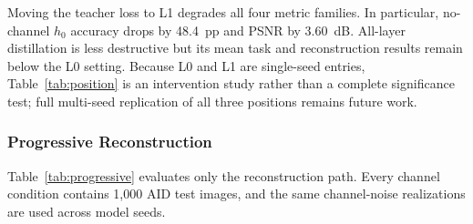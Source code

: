 \documentclass[letterpaper,journal]{IEEEtran}
\newcommand{\pp}{~pp\xspace}
\begin{document}
Moving the teacher loss to L1 degrades all four metric families. In particular, no-channel $h_0$ accuracy drops by 48.4\pp and PSNR by 3.60~dB. All-layer distillation is less destructive but its mean task and reconstruction results remain below the L0 setting. Because L0 and L1 are single-seed entries, Table~\ref{tab:position} is an intervention study rather than a complete significance test; full multi-seed replication of all three positions remains future work.

\subsubsection{Progressive Reconstruction}
\label{sec:progressive}
Table~\ref{tab:progressive} evaluates only the reconstruction path. Every channel condition contains 1,000 AID test images, and the same channel-noise realizations are used across model seeds.
\end{document}

